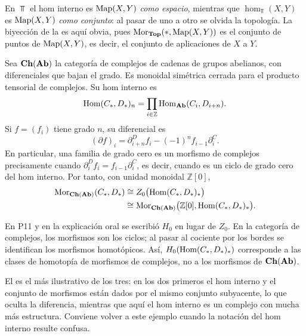 \begin{ejem}\label{ejem:top-hom}
En $\Top$ el hom interno es $\operatorname{Map}(X,Y)$ \emph{como espacio}, mientras que $\hom_{\Top}(X,Y)$ es $\operatorname{Map}(X,Y)$ \emph{como conjunto}: al pasar de uno a otro se olvida la topología. La biyección de la  es aquí obvia, pues $\operatorname{Mor}_{\mathbf{Top}}(*,\operatorname{Map}(X,Y))$ es el conjunto de puntos de $\operatorname{Map}(X,Y)$, es decir, el conjunto de aplicaciones de $X$ a $Y$.
\end{ejem}

\begin{ejem}\label{ejem:ch}
Sea $\mathbf{Ch}(\mathbf{Ab})$ la categoría de complejos de cadenas de grupos abelianos, con diferenciales que bajan el grado. Es monoidal simétrica cerrada para el producto tensorial de complejos. Su hom interno es
\[
\operatorname{Hom}(C_*,D_*)_n=\prod_{i\in\mathbb Z}\operatorname{Hom}_{\mathbf{Ab}}(C_i,D_{i+n}).
\]
Si $f=(f_i)$ tiene grado $n$, su diferencial es
\[
(\partial f)_i=\partial^D_{i+n}f_i-(-1)^n f_{i-1}\partial^C_i.
\]
En particular, una familia de grado cero es un morfismo de complejos precisamente cuando
$\partial^D_i f_i=f_{i-1}\partial^C_i$, es decir, cuando es un ciclo de grado cero del hom interno. Por tanto, con unidad monoidal $\mathbb Z[0]$,
\[
\begin{aligned}
\operatorname{Mor}_{\mathbf{Ch}(\mathbf{Ab})}(C_*,D_*)
&\cong Z_0\bigl(\operatorname{Hom}(C_*,D_*)_*\bigr)\\
&\cong\operatorname{Mor}_{\mathbf{Ch}(\mathbf{Ab})}
 \bigl(\mathbb Z[0],\operatorname{Hom}(C_*,D_*)_*\bigr).
\end{aligned}
\]
\end{ejem}

\begin{nota}
En P11 y en la explicación oral se escribió $H_0$ en lugar de $Z_0$. En la categoría de complejos, los morfismos son los ciclos; al pasar al cociente por los bordes se identifican los morfismos homotópicos. Así, $H_0(\operatorname{Hom}(C_*,D_*)_*)$ corresponde a las clases de homotopía de morfismos de complejos, no a los morfismos de $\mathbf{Ch}(\mathbf{Ab})$.
\end{nota}

\begin{nota}
   El  es el más ilustrativo de los tres: en los dos primeros el hom interno y el conjunto de morfismos están dados por el mismo conjunto subyacente, lo que oculta la diferencia, mientras que aquí el hom interno es un complejo con mucha más estructura. Conviene volver a este ejemplo cuando la notación del hom interno resulte confusa.
\end{nota}

